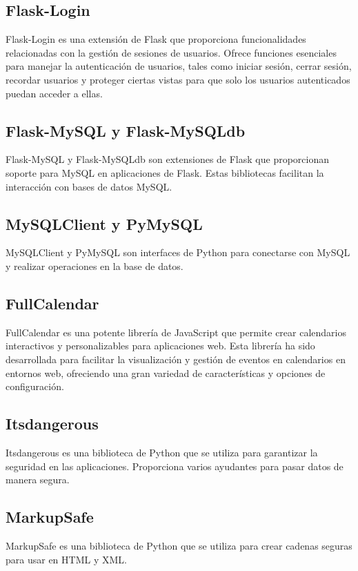 \documentclass[a4paper, 12pt]{book}
\begin{document}
\subsection{Flask-Login}
\label{subsec:flasklogin} 
Flask-Login es una extensión de Flask que proporciona funcionalidades relacionadas con la gestión de sesiones de usuarios. 
Ofrece funciones esenciales para manejar la autenticación de usuarios, tales como iniciar sesión, cerrar sesión, recordar usuarios y proteger ciertas 
vistas para que solo los usuarios autenticados puedan acceder a ellas.

\subsection{Flask-MySQL y Flask-MySQLdb} 
\label{subsec:flaskmysqldb} 
Flask-MySQL y Flask-MySQLdb son extensiones de Flask que proporcionan soporte para MySQL en aplicaciones de Flask. Estas bibliotecas facilitan la interacción con bases de datos MySQL.

\subsection{MySQLClient y PyMySQL} 
\label{subsec:pymysql} 
MySQLClient y PyMySQL son interfaces de Python para conectarse con MySQL y realizar operaciones en la base de datos.
\subsection{FullCalendar}
\label{subsec:fullcalendar}
FullCalendar es una potente librería de JavaScript que permite crear calendarios interactivos y personalizables para aplicaciones web. 
Esta librería ha sido desarrollada para facilitar la visualización y gestión de eventos en calendarios en entornos web, ofreciendo una 
gran variedad de características y opciones de configuración.

\subsection{Itsdangerous} 
\label{subsec:itsdangerous} 
Itsdangerous es una biblioteca de Python que se utiliza para garantizar la seguridad en las aplicaciones. Proporciona varios ayudantes para pasar datos de manera segura.

\subsection{MarkupSafe} 
\label{subsec:markupsafe} 
MarkupSafe es una biblioteca de Python que se utiliza para crear cadenas seguras para usar en HTML y XML.
\end{document}
